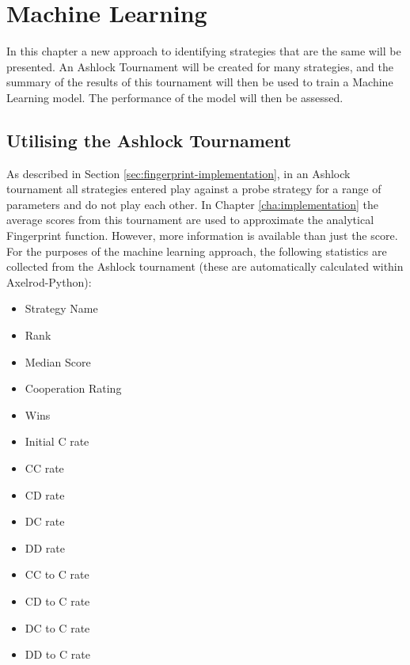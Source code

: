 
\chapter{Machine Learning}\label{cha:machinelearning}

In this chapter a new approach to identifying strategies that are the same will be presented.
An Ashlock Tournament will be created for many strategies, and the summary of the results of this tournament will then be used to train a Machine Learning model.
The performance of the model will then be assessed.



\section{Utilising the Ashlock Tournament}\label{sec:ashlock_tourn}

As described in Section \ref{sec:fingerprint-implementation}, in an Ashlock tournament all strategies entered play against a probe strategy for a range of parameters and do not play each other.
In Chapter \ref{cha:implementation} the average scores from this tournament are used to approximate the analytical Fingerprint function.
However, more information is available than just the score.
For the purposes of the machine learning approach, the following statistics are collected from the Ashlock tournament (these are automatically calculated within Axelrod-Python):

\begin{multicols}{3}
\begin{itemize}
    \item Strategy Name
    \item Rank
    \item Median Score
    \item Cooperation Rating
    \item Wins
    \item Initial C rate
    \item CC rate
    \item CD rate
    \item DC rate
    \item DD rate
    \item CC to C rate
    \item CD to C rate
    \item DC to C rate
    \item DD to C rate
\end{itemize}
\end{multicols}

